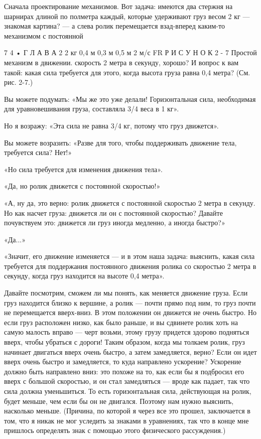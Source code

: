 \documentclass[10pt,oneside]{article}
\begin{document}
Сначала проектирование механизмов. Вот задача: имеются два стержня на шарнирах длиной по полметра каждый, которые удерживают груз весом 2 кг --- знакомая картина? --- а слева ролик перемещается взад-вперед каким-то механизмом с постоянной\par

7 4 • Г Л А В А  2 2 кг 0,4 м 0,3 м 0,5 м 2 м/с FR Р И С У Н О К  2 - 7 Простой механизм в движении. скорость 2 метра в секунду, хорошо? И вопрос к вам такой: какая сила требуется для этого, когда высота груза равна 0,4 метра? (См. рис. 2-7.)\par

Вы можете подумать: «Мы же это уже делали! Горизонтальная сила, необходимая для уравновешивания груза, составляла 3/4 веса в 1 кг».\par

Но я возражу: «Эта сила не равна 3/4 кг, потому что груз движется».\par

Вы можете возразить: «Разве для того, чтобы поддерживать движение тела, требуется сила? Нет!»\par

«Но сила требуется для изменения движения тела».\par

«Да, но ролик движется с постоянной скоростью!»\par

«А, ну да, это верно: ролик движется с постоянной скоростью 2 метра в секунду. Но как насчет груза: движется ли он с постоянной скоростью? Давайте почувствуем это: движется ли груз иногда медленно, а иногда быстро?»\par

«Да...»\par

«Значит, его движение изменяется --- и в этом наша задача: выяснить, какая сила требуется для поддержания постоянного движения ролика со скоростью 2 метра в секунду, когда груз находится на высоте 0,4 метра».\par

Давайте посмотрим, сможем ли мы понять, как меняется движение груза. Если груз находится близко к вершине, а ролик --- почти прямо под ним, то груз почти не перемещается вверх-вниз. В этом положении он движется не очень быстро. Но если груз расположен низко, как было раньше, и вы сдвинете ролик хоть на самую малость вправо --- черт возьми, этому грузу придется здорово подняться вверх, чтобы убраться с дороги! Таким образом, когда мы толкаем ролик, груз начинает двигаться вверх очень быстро, а затем замедляется, верно? Если он идет вверх очень быстро и замедляется, то куда направлено ускорение? Ускорение должно быть направлено вниз: это похоже на то, как если бы я подбросил его вверх с большой скоростью, и он стал замедляться --- вроде как падает, так что сила должна уменьшиться. То есть горизонтальная сила, действующая на ролик, будет меньше, чем если бы он не двигался. Поэтому нам нужно выяснить, насколько меньше. (Причина, по которой я через все это прошел, заключается в том, что я никак не мог уследить за знаками в уравнениях, так что в конце мне пришлось определять знак с помощью этого физического рассуждения.)\par
\end{document}
